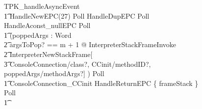 \begin{figure}[t!]
  \begin{circusaction}
    TPK\_handleAsyncEvent \circdef \\
    \t1 HandleNewEPC(27) \circseq Poll \circseq HandleDupEPC \circseq Poll \circseq  HandleAconst\_nullEPC \circseq Poll \circseq \\
    \t1 (\circvar poppedArgs : \seq Word \circspot \\
    \t2 \lschexpract \exists argsToPop? == m + 1 @ InterpreterStackFrameInvoke \rschexpract \circseq \\
    \t2 \lschexpract InterpreterNewStackFrame[\\
    \t3 ConsoleConnection/class?, CCinit/methodID?, poppedArgs/methodArgs?] \rschexpract) \circseq Poll \circseq \\
    \t1 ConsoleConnection\_CCinit \circseq HandleReturnEPC \circseq \{ frameStack \neq \emptyset \} \circseq Poll \circseq \\
    \t1 {} \cdots {} \\

\end{circusaction}
\end{figure}
